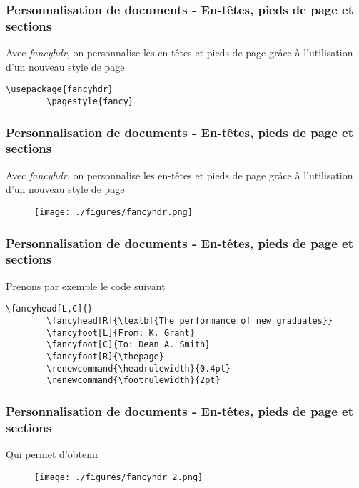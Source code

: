 \begin{frame}[fragile]
    \frametitle{Personnalisation de documents - En-têtes, pieds de page et sections}
    Avec \textcolor{vibrant_green}{\textit{fancyhdr}}\footnotemark, on personnalise les en-têtes et pieds de page grâce à l'utilisation d'un nouveau style de page
    \vfill
    \begin{lstlisting}[xleftmargin=1cm]
        \usepackage{fancyhdr}
        \pagestyle{fancy}
    \end{lstlisting}
\end{frame}

\begin{frame}[fragile]
    \frametitle{Personnalisation de documents - En-têtes, pieds de page et sections}
    Avec \textcolor{vibrant_green}{\textit{fancyhdr}}\footnotemark, on personnalise les en-têtes et pieds de page grâce à l'utilisation d'un nouveau style de page
    \vfill
    \begin{figure}
        \centering
            \texttt{[image: ./figures/fancyhdr.png]}
            \label{fig: fancyhdr}
    \end{figure}
\end{frame}

\begin{frame}[fragile]
    \frametitle{Personnalisation de documents - En-têtes, pieds de page et sections}
    Prenons par exemple le code suivant
    \vfill
    \begin{lstlisting}[xleftmargin=-1.75cm]
        \fancyhead[L,C]{}
        \fancyhead[R]{\textbf{The performance of new graduates}}
        \fancyfoot[L]{From: K. Grant}
        \fancyfoot[C]{To: Dean A. Smith}
        \fancyfoot[R]{\thepage}
        \renewcommand{\headrulewidth}{0.4pt}
        \renewcommand{\footrulewidth}{2pt}
    \end{lstlisting}
    \vfill
\end{frame}

\begin{frame}[fragile]
    \frametitle{Personnalisation de documents - En-têtes, pieds de page et sections}
    Qui permet d'obtenir
    \vfill
    \begin{figure}
        \centering
            \texttt{[image: ./figures/fancyhdr\_2.png]}
            \label{fig: fancyhdr_2}
    \end{figure}
    \vfill
\end{frame}

